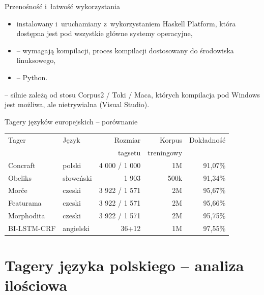 \documentclass[xcolor=dvipsnames,polish]{beamer}
\begin{document}
\begin{frame}{Przenośność i~łatwość wykorzystania}
  \begin{itemize}
    \item {} instalowany i~uruchamiany z~wykorzystaniem Haskell Platform, która dostępna jest pod wszystkie główne systemy operacyjne,
    \item {} -- wymagają kompilacji, proces kompilacji dostosowany do środowiska linuksowego,
    \item {} -- Python.
  \end{itemize}
  \vspace{1cm}

   -- silnie zależą od stosu Corpus2 / Toki / Maca, których kompilacja pod Windows jest możliwa, ale nietrywialna (Visual Studio).
\end{frame}


\begin{frame}{Tagery języków europejskich -- porównanie}
  \begin{center}
  \begin{tabular}{l|l|r|r|r}
    Tager       & Język     & Rozmiar & Korpus  & Dokładność \\
                &           & tagsetu & treningowy & \\ \hline
    Concraft    & polski    & 4 000 / 1 000 & 1M    & 91,07\% \\
    Obeliks     & słoweński & 1 903 & 500k  & 91,34\% \\
    Morče       & czeski    & 3 922 / 1 571 & 2M    & 95,67\% \\
    Featurama   & czeski    & 3 922 / 1 571 & 2M    & 95,66\% \\
    Morphodita  & czeski    & 3 922 / 1 571 & 2M    & 95,75\% \\
    BI-LSTM-CRF & angielski & 36+12   & 1M   & 97,55\% \\
  \end{tabular}
  \end{center}
\end{frame}

\section{Tagery języka polskiego -- analiza ilościowa}
\frame{\sectionpage}
\end{document}
